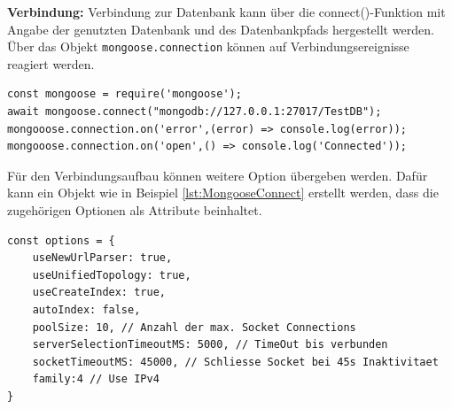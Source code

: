 \newpage
\noindent
\textbf{Verbindung:}
Verbindung zur Datenbank kann über die connect()-Funktion mit Angabe der genutzten Datenbank und des Datenbankpfads hergestellt werden. 
Über das Objekt \texttt{mongoose.connection} können auf Verbindungsereignisse reagiert werden. 
\newline

\begin{lstlisting}[caption=Mongoose: Verbindung zur Datenbank aufbauen,
label=lst:MongooseConnect]
const mongoose = require('mongoose');
await mongoose.connect("mongodb://127.0.0.1:27017/TestDB");
mongooose.connection.on('error',(error) => console.log(error));
mongooose.connection.on('open',() => console.log('Connected'));
\end{lstlisting}

\noindent
Für den Verbindungsaufbau können weitere Option übergeben werden. Dafür kann ein Objekt wie in Beispiel \ref{lst:MongooseConnect} erstellt werden, dass die zugehörigen Optionen als Attribute beinhaltet. 
\newline

\begin{lstlisting}[caption=Mongoose Verbindungsoptionen \protect \footnotemark  ,label=lst:MongooseConnect]
const options = {
	useNewUrlParser: true,
	useUnifiedTopology: true,
	useCreateIndex: true,
	autoIndex: false,
	poolSize: 10, // Anzahl der max. Socket Connections
	serverSelectionTimeoutMS: 5000, // TimeOut bis verbunden
	socketTimeoutMS: 45000, // Schliesse Socket bei 45s Inaktivitaet
	family:4 // Use IPv4
}
\end{lstlisting}


